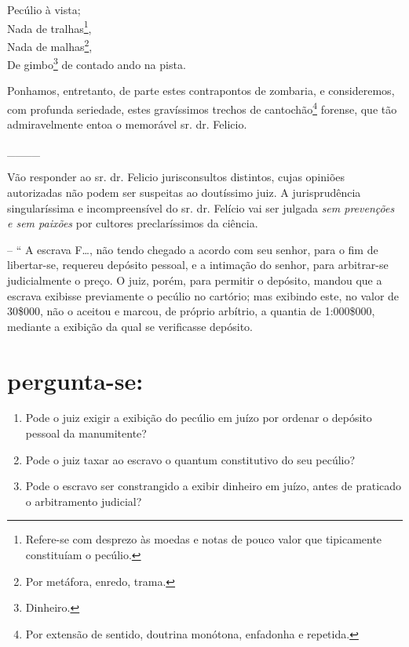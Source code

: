 Pecúlio à vista;\\
Nada de tralhas\footnote{ Refere-se com desprezo às moedas e notas de
  pouco valor que tipicamente constituíam o pecúlio.},\\
Nada de malhas\footnote{ Por metáfora, enredo, trama.},\\
De gimbo\footnote{ Dinheiro.} de contado ando na pista.

Ponhamos, entretanto, de parte estes contrapontos de zombaria, e
consideremos, com profunda seriedade, estes gravíssimos trechos de
cantochão\footnote{ Por extensão de sentido, doutrina monótona,
  enfadonha e repetida.} forense, que tão admiravelmente entoa o
memorável sr. dr. Felicio.

\_\_\_\_

Vão responder ao sr. dr. Felicio jurisconsultos distintos, cujas
opiniões autorizadas não podem ser suspeitas ao doutíssimo juiz. A
jurisprudência singularíssima e incompreensível do sr. dr. Felício vai
ser julgada \emph{sem prevenções e sem paixões} por cultores
preclaríssimos da ciência.

-- `` A escrava F\ldots{}, não tendo chegado a acordo com seu senhor, para o
fim de libertar-se, requereu depósito pessoal, e a intimação do senhor,
para arbitrar-se judicialmente o preço. O juiz, porém, para permitir o
depósito, mandou que a escrava exibisse previamente o pecúlio no
cartório; mas exibindo este, no valor de 30\$000, não o aceitou e
marcou, de próprio arbítrio, a quantia de 1:000\$000, mediante a
exibição da qual se verificasse depósito.

\section{pergunta-se:}

\begin{enumerate}[label=\arabic*º]
\item Pode o juiz exigir a exibição do pecúlio em juízo por ordenar o
depósito pessoal da manumitente?

\item Pode o juiz taxar ao escravo o quantum constitutivo do seu
pecúlio?

\item Pode o escravo ser constrangido a exibir dinheiro em juízo, antes
de praticado o arbitramento judicial?
\end{enumerate}

